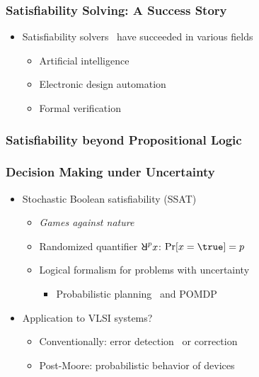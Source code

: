 \begin{frame}
      \frametitle{Satisfiability Solving: A Success Story}
      \begin{itemize}
            \item Satisfiability solvers~\cite{SATHandbook} have succeeded in various fields
                  \begin{itemize}
                        \item Artificial intelligence~\cite{Nilsson2014,Russell2020}
                        \item Electronic design automation~\cite{Marques2000,Wang2009}
                        \item Formal verification~\cite{Berard2013,Jhala2009}
                  \end{itemize}
      \end{itemize}
\end{frame}

\begin{frame}
      \frametitle{Satisfiability beyond Propositional Logic}
      \begin{figure}
            \centering
            
      \end{figure}
\end{frame}

\begin{frame}
      \frametitle{Decision Making under Uncertainty}
      \begin{itemize}
            \item Stochastic Boolean satisfiability (SSAT)
                  \begin{itemize}
                        \item \emph{Games against nature}~\cite{Papadimitriou1985}
                        \item Randomized quantifier $\random{p}x$: $\spb{x=\true}=p$
                        \item Logical formalism for problems with uncertainty
                              \begin{itemize}
                                    \item Probabilistic planning~\cite{Majercik1998,Majercik2003,Majercik2005} and POMDP~\cite{Salmon2020}
                              \end{itemize}
                  \end{itemize}
                  \pause
            \item Application to VLSI systems?
                  \begin{itemize}
                        \item Conventionally: error detection~\cite{Constantinescu2003} or correction~\cite{Mitra2006}
                        \item Post-Moore: probabilistic behavior of devices~\cite{Chakrapani2006ProbDesign}
                  \end{itemize}
      \end{itemize}
\end{frame}

